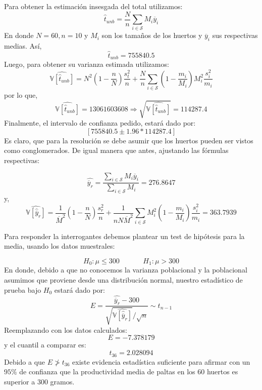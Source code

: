 \begin{solution}
Para obtener la estimación insesgada del total utilizamos:
$$\hat{t}_{unb}=\dfrac{N}{n} \sum_{i\in \mathcal{S}} M_i \overline{y}_i$$
En donde $N=60, n=10$ y $M_i$ son los tamaños de los huertos y $\overline{y}_i$ sus respectivas medias. Así,
$$\hat{t}_{unb}=755840.5$$
Luego, para obtener su varianza estimada utilizamos:
$$\widehat{\mathbb{V}[ \hat{t}_{unb} ]}=N^2 \left( 1- \dfrac{n}{N}\right) \dfrac{s_{t}^{2}}{n}+\dfrac{N}{n}\sum_{i\in \mathcal{S}} \left( 1 -\dfrac{m_i}{M_i}\right)M_{i}^{2} \dfrac{s_{i}^{2}}{m_i} $$
por lo que,
$$\widehat{\mathbb{V}[ \hat{t}_{unb} ]}=13061603608\Rightarrow \sqrt{\widehat{\mathbb{V}[ \hat{t}_{unb} ]}}= 114287.4$$
Finalmente, el intervalo de confianza pedido, estará dado por:
$$\left[ 755840.5 \pm 1.96 * 114287.4 \right] $$
Es claro, que para la resolución se debe asumir que los huertos pueden ser vistos como conglomerados.
De igual manera que antes, ajustando las fórmulas respectivas:

$$\widehat{\overline{y}_r}=\dfrac{\sum_{i\in \mathcal{S}}M_i \overline{y}_i}{\sum_{i\in \mathcal{S}}M_i}=276.8647$$
y,
$$\widehat{\mathbb{V}[ \hat{\overline{y}}_{r} ]}=\dfrac{1}{\overline{M}^2}\left( 1- \dfrac{n}{N}\right) \dfrac{s_{r}^{2}}{n}+\dfrac{1}{nN\overline{M}^2}\sum_{i\in \mathcal{S}} M_{i}^2 \left( 1 -\dfrac{m_i}{M_i}\right)\dfrac{s_{i}^{2}}{m_i}=363.7939$$

Para responder la interrogantes debemos plantear un test de hipótesis para la media, usando los datos muestrales:

$$ H_0: \mu \leq 300 \hspace{40pt} H_1: \mu > 300$$
En donde, debido a que no conocemos la varianza poblacional y la poblacional asumimos que proviene desde una distribución normal, nuestro estadístico de prueba bajo $H_0$ estará dado por:
$$E= \dfrac{\widehat{\overline{y}_r}-300}{\sqrt{\widehat{\mathbb{V}[ \hat{\overline{y}}_{r} ]}} \Big/\sqrt{n}}\sim t_{n-1}$$
Reemplazando con los datos calculados:
$$E=-7.378179$$
y el cuantil a comparar es: 
$$t_{36}=2.028094$$
Debido a que $E \ngtr t_{36}$ existe evidencia estadística suficiente para afirmar con un $95\%$ de confianza que la productividad media de paltas en los 60 huertos es superior a 300 gramos.
\end{solution}